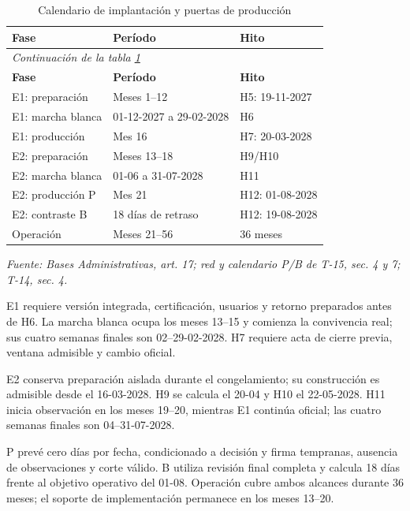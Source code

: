 \begingroup\small\setlength{\tabcolsep}{3pt}
\begin{longtable}{p{}p{}p{}}
\caption{Calendario de implantación y puertas de producción}\label{tab:t18-fases}\\\hline
\textbf{Fase} & \textbf{Período} & \textbf{Hito}\\\hline\endfirsthead
\multicolumn{3}{l}{\textit{Continuación de la tabla \ref{tab:t18-fases}}}\\\hline
\textbf{Fase} & \textbf{Período} & \textbf{Hito}\\\hline\endhead
\hline\endfoot\hline\endlastfoot
E1: preparación & Meses 1--12 & H5: 19-11-2027\\\hline
E1: marcha blanca & 01-12-2027 a 29-02-2028 & H6\\\hline
E1: producción & Mes 16 & H7: 20-03-2028\\\hline
E2: preparación & Meses 13--18 & H9/H10\\\hline
E2: marcha blanca & 01-06 a 31-07-2028 & H11\\\hline
E2: producción P & Mes 21 & H12: 01-08-2028\\\hline
E2: contraste B & 18 días de retraso & H12: 19-08-2028\\\hline
Operación & Meses 21--56 & 36 meses\\\hline
\end{longtable}\endgroup
\noindent\textit{Fuente: Bases Administrativas, art. 17; red y calendario P/B de T-15, sec. 4 y 7; T-14, sec. 4.}

E1 requiere versión integrada, certificación, usuarios y retorno preparados antes de H6. La marcha blanca ocupa los meses 13--15 y comienza la convivencia real; sus cuatro semanas finales son 02--29-02-2028. H7 requiere acta de cierre previa, ventana admisible y cambio oficial.

E2 conserva preparación aislada durante el congelamiento; su construcción es admisible desde el 16-03-2028. H9 se calcula el 20-04 y H10 el 22-05-2028. H11 inicia observación en los meses 19--20, mientras E1 continúa oficial; las cuatro semanas finales son 04--31-07-2028.

P prevé cero días por fecha, condicionado a decisión y firma tempranas, ausencia de observaciones y corte válido. B utiliza revisión final completa y calcula 18 días frente al objetivo operativo del 01-08. Operación cubre ambos alcances durante 36 meses; el soporte de implementación permanece en los meses 13--20.



